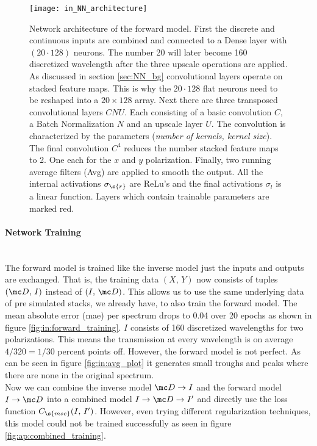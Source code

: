 \begin{figure}[H]
    \centering
    \texttt{[image: in\_NN\_architecture]}
    \caption{Network architecture of the forward model. First the discrete and continuous inputs are combined and connected to a Dense layer with 
    $(20 \cdot 128)$
    neurons. The number 20 will later become 160 discretized wavelength after the three upscale operations are applied. As discussed in section \ref{sec:NN_bg} convolutional layers operate on stacked feature maps. This is why the $20 \cdot 128$ flat neurons need to be reshaped into a $20 \times 128$ array. Next there are three transposed convolutional layers $CNU$. Each consisting of a basic convolution $C$, a Batch Normalization $N$ and an upscale layer $U$. The convolution is characterized by the parameters (\textit{number of kernels, kernel size}). The final convolution $C^4$ reduces the number stacked feature maps to 2. One each for the $x$ and $y$ polarization. Finally, two running average filters (Avg) are applied to smooth the output. All the internal activations $\sigma_\s{r}$ are ReLu's and the final activations $\sigma_{l}$ is a linear function.
    Layers which contain trainable parameters are marked red.
    }
    \label{fig:in:NN}
\end{figure}



\newpage
\paragraph{Network Training}~\\
The forward model is trained like the inverse model just the inputs and outputs are exchanged. That is, the training data $(X,\, Y)$ now consists of tuples 
$(\mc D,\, I)$ instead of $(I,\, \mc D)$.
This allows us to use the same underlying data of pre simulated stacks, we already have, to also train the forward model. 
The mean absolute error (mae) per spectrum drops to 0.04 over 20 epochs as shown in figure \ref{fig:in:forward_training}. $I$ consists of 160 discretized wavelengths for two polarizations. This means the transmission at every wavelength is on average $4/320 = 1/30$ percent points off. However, the forward model is not perfect. As can be seen in figure \ref{fig:in:avg_plot} it generates small troughs and peaks where there are none in the original spectrum.
\\

\indent
Now we can combine the inverse model $\mc D \rightarrow I$ and the forward model $I \rightarrow \mc D$ into a combined model $I \rightarrow \mc D \rightarrow I'$ and directly use the loss function $C_\s{mse}(I,\, I')$.
However, even trying different regularization techniques, this model could not be trained successfully as seen in figure \ref{fig:ap:combined_training}.  


